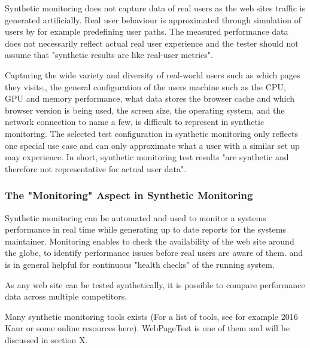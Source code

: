 Synthetic monitoring does not capture data of real users as the web sites traffic is generated artificially.
Real user behaviour is approximated through simulation of users by for example predefining user paths.
The measured performance data does not necessarily reflect actual real user experience and the tester should not assume that "synthetic results are like real-user metrics". %

Capturing the wide variety and diversity of real-world users such as which pages they visits,, the general configuration of the users machine such as the CPU, GPU and memory performance, what data stores the browser cache and which browser version is being used, the screen size, the operating system, and the network connection to name a few, is difficult to represent in synthetic monitoring. %
The selected test configuration in synthetic monitoring only reflects one special use case and can only approximate what a user with a similar set up may experience. %
In short, synthetic monitoring test results "are synthetic and therefore not representative for actual user data".  %



\subsubsection{The "Monitoring" Aspect in Synthetic Monitoring}


Synthetic monitoring can be automated and used to monitor a systems performance in real time while generating up to date reports for the systems maintainer. %
Monitoring enables to check the availability of the web site around the globe, %
to identify performance issues before real users are aware of them. %
and is in general helpful for continuous "health checks" of the running system. %

As any web site can be tested synthetically, it is possible to compare performance data across multiple competitors. %



Many synthetic monitoring tools exists (For a list of tools, see for example 2016 Kaur or some online resources here).
WebPageTest is one of them and will be discussed in section X.


